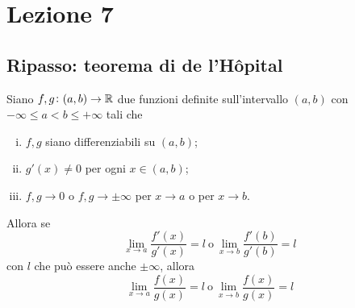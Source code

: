 \section{Lezione 7}
\subsection{Ripasso: teorema di de \texorpdfstring{l'H{\^o}pital}{l'Hôpital}}
\begin{theorem}
    \label{th:6.4}
    Siano $f,g\colon(a,b)\to\amsbb{R}$ due funzioni definite sull'intervallo $(a,b)$ con $-\infty \le a < b \le +\infty$ tali che
    \begin{enumerate}[(i)]
        \item $f,g$ siano differenziabili su $(a,b)$;
        \item $g'(x)\ne 0$ per ogni $x\in(a,b)$;
        \item $f, g \to 0$ o $f,g\to \pm \infty$ per $x\to a$ o per $x\to b$. 
    \end{enumerate}
    Allora se
    \[
    \lim_{x\to a} \frac{f'(x)}{g'(x)} = l \ \text{o} \ \lim_{x\to b} \frac{f'(b)}{g'(b)} = l
    \]
    con $l$ che può essere anche $\pm \infty$, allora
    \[
    \lim_{x\to a} \frac{f(x)}{g(x)} = l \ \text{o} \ \lim_{x\to b}\frac{f(x)}{g(x)} = l
    \]
\end{theorem}
